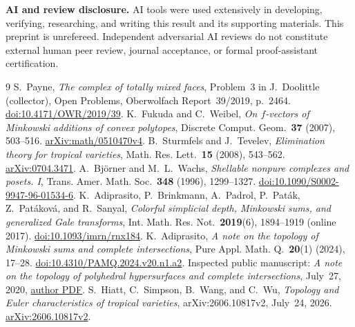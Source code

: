 \documentclass[11pt]{article}
\begin{document}
\textbf{AI and review disclosure.} AI tools were used extensively in
developing, verifying, researching, and writing this result and its
supporting materials. This preprint is unrefereed. Independent
adversarial AI reviews do not constitute external human peer review,
journal acceptance, or formal proof-assistant certification.

\clearpage
\begin{thebibliography}{9}
 S.~Payne, \emph{The complex of totally mixed faces},
Problem~3 in J.~Doolittle (collector), Open Problems, Oberwolfach
Report~39/2019, p.~2464.
\href{https://doi.org/10.4171/OWR/2019/39}{doi:10.4171/OWR/2019/39}.
 K.~Fukuda and C.~Weibel, \emph{On $f$-vectors of Minkowski
additions of convex polytopes}, Discrete Comput. Geom.\
\textbf{37} (2007), 503--516.
\href{https://arxiv.org/abs/math/0510470v4}{arXiv:math/0510470v4}.
\bibitem{ST} B.~Sturmfels and J.~Tevelev, \emph{Elimination theory for
tropical varieties}, Math. Res. Lett.\ \textbf{15} (2008), 543--562.
\href{https://arxiv.org/abs/0704.3471}{arXiv:0704.3471}.
 A.~Bj\"orner and M.~L.~Wachs, \emph{Shellable nonpure
complexes and posets. I}, Trans. Amer. Math. Soc.\
\textbf{348} (1996), 1299--1327.
\href{https://doi.org/10.1090/S0002-9947-96-01534-6}{doi:10.1090/S0002-9947-96-01534-6}.
\bibitem{AB} K.~Adiprasito, P.~Brinkmann, A.~Padrol, P.~Pat\'ak,
Z.~Pat\'akov\'a, and R.~Sanyal, \emph{Colorful simplicial depth,
Minkowski sums, and generalized Gale transforms}, Int. Math. Res.
Not.\ \textbf{2019}(6), 1894--1919 (online 2017).
\href{https://doi.org/10.1093/imrn/rnx184}{doi:10.1093/imrn/rnx184}.
\bibitem{A} K.~Adiprasito, \emph{A note on the topology of Minkowski
sums and complete intersections}, Pure Appl. Math. Q.\
\textbf{20}(1) (2024), 17--28.
\href{https://doi.org/10.4310/PAMQ.2024.v20.n1.a2}{doi:10.4310/PAMQ.2024.v20.n1.a2}.
Inspected public manuscript: \emph{A note on the topology of polyhedral
hypersurfaces and complete intersections}, July~27, 2020,
\href{https://webusers.imj-prg.fr/~karim.adiprasito/cint.pdf}{author PDF}.
\bibitem{HSWW} S.~Hiatt, C.~Simpson, B.~Wang, and C.~Wu,
\emph{Topology and Euler characteristics of tropical varieties},
arXiv:2606.10817v2, July~24, 2026.
\href{https://arxiv.org/abs/2606.10817v2}{arXiv:2606.10817v2}.
\end{thebibliography}
\end{document}
